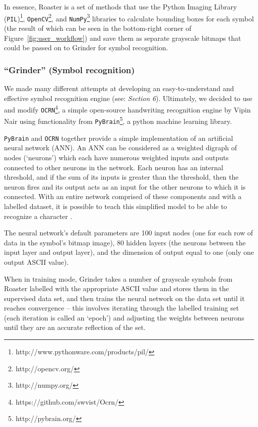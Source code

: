 \documentclass{acm_proc_article-sp}
\begin{document}
In essence, Roaster is a set of methods that use the Python Imaging Library (\texttt{PIL})\footnote{http://www.pythonware.com/products/pil/}, \texttt{OpenCV}\footnote{http://opencv.org/}, and \texttt{NumPy}\footnote{http://numpy.org/} libraries to calculate bounding boxes for each symbol (the result of which can be seen in the bottom-right corner of Figure~\ref{fig:user_workflow}) and save them as separate grayscale bitmaps that could be passed on to Grinder for symbol recognition.

\label{subsection:roaster}
\subsubsection{``Grinder'' (Symbol recognition)}
We made many different attempts at developing an easy-to-understand and effective symbol recognition engine (see: \emph{Section 6}). Ultimately, we decided to use and modify  \texttt{OCRN}\footnote{https://github.com/swvist/Ocrn/}, a simple open-source handwriting recognition engine by Vipin Nair using functionality from \texttt{PyBrain}\footnote{http://pybrain.org/}, a python machine learning library.

\texttt{PyBrain} and \texttt{OCRN} together provide a simple implementation of an artificial neural network (ANN). An ANN can be considered as a weighted digraph of nodes (`neurons') which each have numerous weighted inputs and outputs connected to other neurons in the network. Each neuron has an internal threshold, and if the sum of its inputs is greater than the threshold, then the neuron fires and its output acts as an input for the other neurons to which it is connected. With an entire network comprised of these components and with a labelled dataset, it is possible to teach this simplified model to be able to recognize a character \cite{jain1996artificial}.

The neural network's default parameters are 100 input nodes (one for each row of data in the symbol's bitmap image), 80 hidden layers (the neurons between the input layer and output layer), and the dimension of output equal to one (only one output ASCII value).

When in training mode, Grinder takes a number of grayscale symbols from Roaster labelled with the appropriate ASCII value and stores them in the supervised data set, and then trains the neural network on the data set until it reaches convergence -- this involves iterating through the labelled training set (each iteration is called an `epoch') and adjusting the weights between neurons until they are an accurate reflection of the set. 
\end{document}
